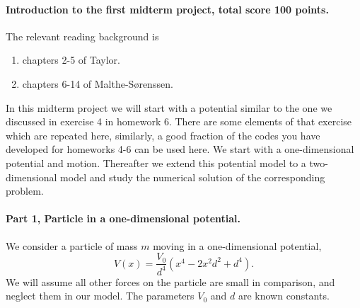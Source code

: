 \documentclass[%
oneside,                 %
final,                   %
10pt]{article}
\begin{document}
\noindent
\paragraph{Introduction to the first midterm project, total score 100 points.}
The relevant reading background is
\begin{enumerate}
\item chapters 2-5 of Taylor.

\item chapters 6-14 of Malthe-Sørenssen.
\end{enumerate}

\noindent
In this midterm project we will start with a potential similar to the
one we discussed in exercise 4 in homework 6. There are some elements
of that exercise which are repeated here, similarly, a good fraction
of the codes you have developed for homeworks 4-6 can be used here.
We start with a one-dimensional potential and motion.  Thereafter we
extend this potential model to a two-dimensional model and study the
numerical solution of the corresponding problem.

\paragraph{Part 1, Particle in a one-dimensional  potential.}
We consider a particle of mass $m$ moving in a one-dimensional potential,
\[
V(x)=\frac{V_0}{d^4}\left(x^4-2x^2d^2+d^4\right).
\]
We will assume all other forces on the particle are small in comparison, and neglect them in our model.  The parameters $V_0$ and $d$ are known constants. 
\end{document}
